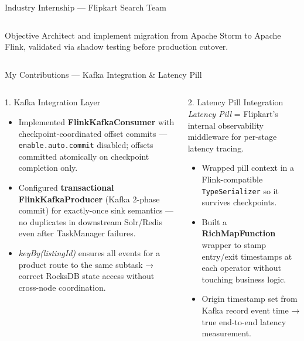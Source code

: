 \documentclass[aspectratio=169,xcolor=dvipsnames,10pt]{beamer}
\begin{document}
\begin{frame}{Industry Internship --- Flipkart Search Team}
\begin{columns}[T]
        \vspace{0.4em}
        \begin{exampleblock}{Objective}
            \footnotesize
            Architect and implement migration from Apache Storm to Apache Flink, validated via shadow testing before production cutover.
        \end{exampleblock}
    \end{columns}
\end{frame}

\begin{frame}{My Contributions --- Kafka Integration \& Latency Pill}
    \begin{columns}[T]
        \begin{block}{1. Kafka Integration Layer}
            \footnotesize
            \begin{itemize}
                \item Implemented \textbf{FlinkKafkaConsumer} with checkpoint-coordinated offset commits — \texttt{enable.auto.commit} disabled; offsets committed atomically on checkpoint completion only.
                \item Configured \textbf{transactional FlinkKafkaProducer} (Kafka 2-phase commit) for exactly-once sink semantics — no duplicates in downstream Solr/Redis even after TaskManager failures.
                \item \textit{keyBy(listingId)} ensures all events for a product route to the same subtask → correct RocksDB state access without cross-node coordination.
            \end{itemize}
        \end{block}

        \begin{block}{2. Latency Pill Integration}
            \footnotesize
            \textit{Latency Pill} = Flipkart's internal observability middleware for per-stage latency tracing.
            \begin{itemize}
                \item Wrapped pill context in a Flink-compatible \texttt{TypeSerializer} so it survives checkpoints.
                \item Built a \textbf{RichMapFunction} wrapper to stamp entry/exit timestamps at each operator without touching business logic.
                \item Origin timestamp set from Kafka record event time → true end-to-end latency measurement.
            \end{itemize}
        \end{block}
    \end{columns}


\end{frame}
\end{document}
